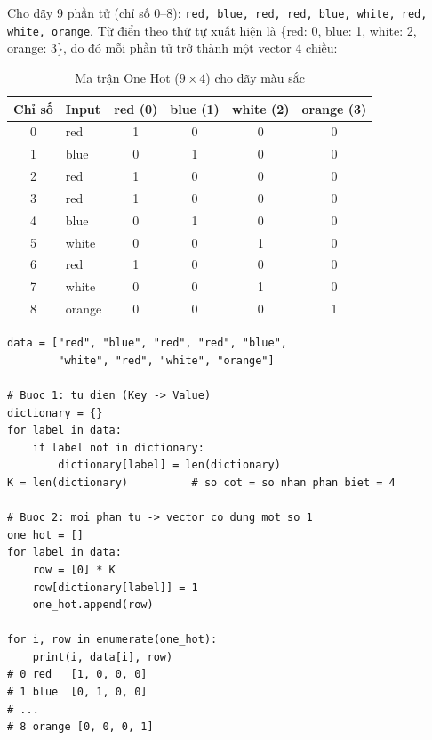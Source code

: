 \begin{example}
Cho dãy 9 phần tử (chỉ số 0--8): \texttt{red, blue, red, red, blue, white, red, white, orange}. Từ điển theo thứ tự xuất hiện là \{red: 0, blue: 1, white: 2, orange: 3\}, do đó mỗi phần tử trở thành một vector 4 chiều:
\end{example}

\begin{table}[H]
\centering
\begin{tabular}{|c|l|c|c|c|c|}
\hline
\textbf{Chỉ số} & \textbf{Input} & \textbf{red (0)} & \textbf{blue (1)} & \textbf{white (2)} & \textbf{orange (3)} \\
\hline
0 & red    & 1 & 0 & 0 & 0 \\ \hline
1 & blue   & 0 & 1 & 0 & 0 \\ \hline
2 & red    & 1 & 0 & 0 & 0 \\ \hline
3 & red    & 1 & 0 & 0 & 0 \\ \hline
4 & blue   & 0 & 1 & 0 & 0 \\ \hline
5 & white  & 0 & 0 & 1 & 0 \\ \hline
6 & red    & 1 & 0 & 0 & 0 \\ \hline
7 & white  & 0 & 0 & 1 & 0 \\ \hline
8 & orange & 0 & 0 & 0 & 1 \\ \hline
\end{tabular}
\caption{Ma trận One Hot ($9 \times 4$) cho dãy màu sắc}
\label{tab:onehot}
\end{table}


\begin{lstlisting}[caption={Tự cài đặt One Hot Encoder bằng list, for và dictionary}]
data = ["red", "blue", "red", "red", "blue",
        "white", "red", "white", "orange"]

# Buoc 1: tu dien (Key -> Value)
dictionary = {}
for label in data:
    if label not in dictionary:
        dictionary[label] = len(dictionary)
K = len(dictionary)          # so cot = so nhan phan biet = 4

# Buoc 2: moi phan tu -> vector co dung mot so 1
one_hot = []
for label in data:
    row = [0] * K
    row[dictionary[label]] = 1
    one_hot.append(row)

for i, row in enumerate(one_hot):
    print(i, data[i], row)
# 0 red   [1, 0, 0, 0]
# 1 blue  [0, 1, 0, 0]
# ...
# 8 orange [0, 0, 0, 1]
\end{lstlisting}

